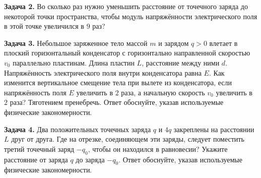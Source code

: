 \begin{taskbasic}[code={\label{task:elem_coulomb_v16_n11}}]
\textbf{Задача 2.} Во сколько раз нужно уменьшить расстояние от точечного заряда до некоторой точки пространства, чтобы модуль напряжённости электрического поля в этой точке увеличился в $9$ раз?

\end{taskbasic}

\begin{taskbasic}[code={\label{task:elem_coulomb_v21_n21}}]
\textbf{Задача 3.} Небольшое заряженное тело массой $m$ и зарядом $q > 0$ влетает в плоский горизонтальный конденсатор с горизонтально направленной скоростью $v_0$ параллельно пластинам. Длина пластин $L$, расстояние между ними $d$. Напряжённость электрического поля внутри конденсатора равна $E$. Как изменится вертикальное смещение тела при вылете из конденсатора, если напряжённость поля $E$ увеличить в $2$ раза, а начальную скорость $v_0$ увеличить в $2$ раза? Тяготением пренебречь. Ответ обоснуйте, указав используемые физические закономерности.

\end{taskbasic}

\begin{taskbasic}[code={\label{task:elem_coulomb_v22_n21}}]
\textbf{Задача 4.} Два положительных точечных заряда $q$ и $4q$ закреплены на расстоянии $L$ друг от друга. Где на отрезке, соединяющем эти заряды, следует поместить третий точечный заряд $-q_0$, чтобы он находился в равновесии? Укажите расстояние от заряда $q$ до заряда $-q_0$. Ответ обоснуйте, указав используемые физические закономерности.

\nopagebreak\smallskip
\begin{center}
\end{center}

\end{taskbasic}

